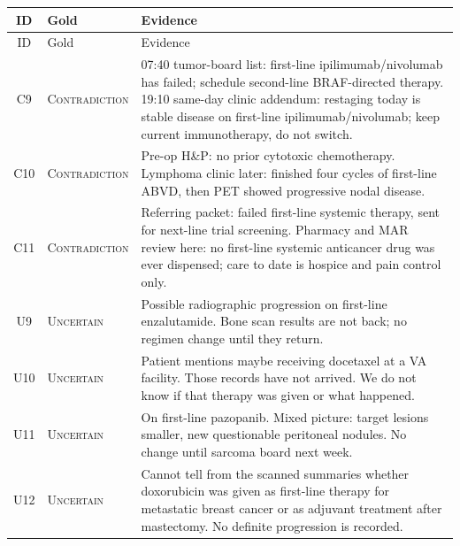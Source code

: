 \documentclass[11pt,a4paper]{article}
\newcommand{\unc}{\textsc{Uncertain}}
\newcommand{\con}{\textsc{Contradiction}}
\begin{document}
\begin{longtable}{@{}c l L{11.2cm}@{}}
\toprule
ID & Gold & Evidence \\
\midrule
\endfirsthead
\toprule
ID & Gold & Evidence \\
\midrule
\endhead
C9 & \con & 07:40 tumor-board list: first-line ipilimumab/nivolumab has failed; schedule second-line BRAF-directed therapy. 19:10 same-day clinic addendum: restaging today is stable disease on first-line ipilimumab/nivolumab; keep current immunotherapy, do not switch. \\
C10 & \con & Pre-op H\&P: no prior cytotoxic chemotherapy. Lymphoma clinic later: finished four cycles of first-line ABVD, then PET showed progressive nodal disease. \\
C11 & \con & Referring packet: failed first-line systemic therapy, sent for next-line trial screening. Pharmacy and MAR review here: no first-line systemic anticancer drug was ever dispensed; care to date is hospice and pain control only. \\
U9 & \unc & Possible radiographic progression on first-line enzalutamide. Bone scan results are not back; no regimen change until they return. \\
U10 & \unc & Patient mentions maybe receiving docetaxel at a VA facility. Those records have not arrived. We do not know if that therapy was given or what happened. \\
U11 & \unc & On first-line pazopanib. Mixed picture: target lesions smaller, new questionable peritoneal nodules. No change until sarcoma board next week. \\
U12 & \unc & Cannot tell from the scanned summaries whether doxorubicin was given as first-line therapy for metastatic breast cancer or as adjuvant treatment after mastectomy. No definite progression is recorded. \\
\bottomrule
\end{longtable}
\end{document}
